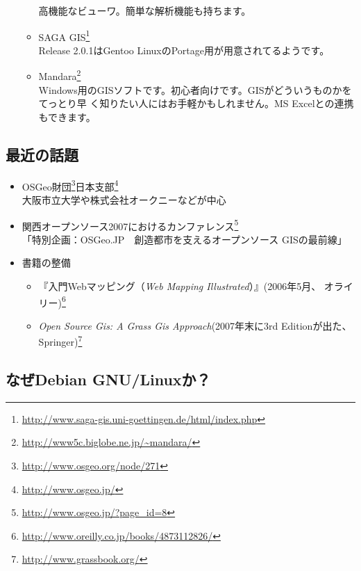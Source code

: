 \documentclass[mingoth,a4paper]{jsarticle}
\begin{document}
\begin{itemize}
\begin{itemize}
	      高機能なビューワ。簡単な解析機能も持ちます。
	\item SAGA
	      GIS\footnote{\url{http://www.saga-gis.uni-goettingen.de/html/index.php}}\\
	      Release 2.0.1はGentoo LinuxのPortage用が用意されてるようです。
	\item Mandara\footnote{\url{http://www5c.biglobe.ne.jp/~mandara/}}\\
	      Windows用のGISソフトです。初心者向けです。GISがどういうものかをてっとり早
	      く知りたい人にはお手軽かもしれません。MS Excelとの連携もできます。
       \end{itemize}
\end{itemize}

\subsection{最近の話題}
\begin{itemize}
 \item OSGeo財団\footnote{\url{http://www.osgeo.org/node/271}}日本支部\footnote{\url{http://www.osgeo.jp/}}\\
       大阪市立大学や株式会社オークニーなどが中心
 \item 関西オープンソース2007におけるカンファレンス\footnote{\url{http://www.osgeo.jp/?page_id=8}}\\
       「特別企画：OSGeo.JP　創造都市を支えるオープンソース GISの最前線」
 \item 書籍の整備
       \begin{itemize}
	\item 『入門Webマッピング（\textit{Web Mapping Illustrated}）』(2006年5月、
	      オライリー)\footnote{\url{http://www.oreilly.co.jp/books/4873112826/}}
	\item \textit{Open Source Gis: A Grass Gis Approach}(2007年末に3rd
	      Editionが出た、Springer)\footnote{\url{http://www.grassbook.org/}}
       \end{itemize}
\end{itemize}

\subsection{なぜDebian GNU/Linuxか？}
\end{document}
